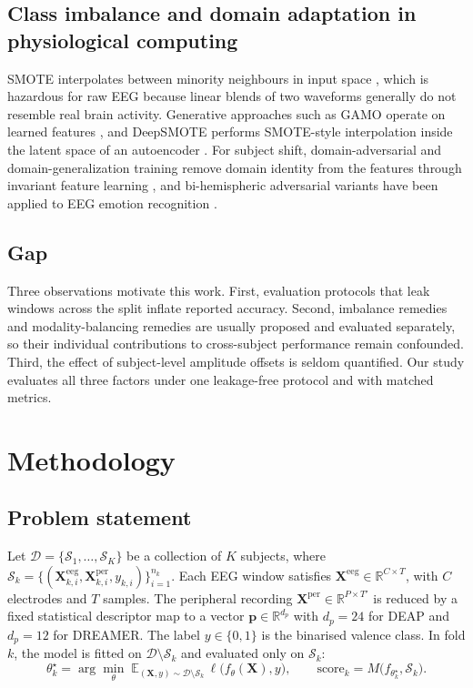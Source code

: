 \documentclass[a4paper,fleqn]{cas-sc}
\begin{document}
\subsection{Class imbalance and domain adaptation in physiological computing}
SMOTE interpolates between minority neighbours in input space \citep{elreedy2021smote}, which is hazardous for raw EEG because linear blends of two waveforms generally do not resemble real brain activity. Generative approaches such as GAMO operate on learned features \citep{mullick2019gamo}, and DeepSMOTE performs SMOTE-style interpolation inside the latent space of an autoencoder \citep{dablain2023deepsmote}. For subject shift, domain-adversarial and domain-generalization training remove domain identity from the features through invariant feature learning \citep{wang2023cross}, and bi-hemispheric adversarial variants have been applied to EEG emotion recognition \citep{li2021bidann}.

\subsection{Gap}
Three observations motivate this work. First, evaluation protocols that leak windows across the split inflate reported accuracy. Second, imbalance remedies and modality-balancing remedies are usually proposed and evaluated separately, so their individual contributions to cross-subject performance remain confounded. Third, the effect of subject-level amplitude offsets is seldom quantified. Our study evaluates all three factors under one leakage-free protocol and with matched metrics.

\section{Methodology}
\label{sec:method}

\subsection{Problem statement}
Let $\mathcal{D}=\{\mathcal{S}_1,\dots,\mathcal{S}_K\}$ be a collection of $K$ subjects, where $\mathcal{S}_k=\{(\mathbf{X}^{\mathrm{eeg}}_{k,i},\mathbf{X}^{\mathrm{per}}_{k,i},y_{k,i})\}_{i=1}^{n_k}$. Each EEG window satisfies $\mathbf{X}^{\mathrm{eeg}}\in\mathbb{R}^{C\times T}$, with $C$ electrodes and $T$ samples. The peripheral recording $\mathbf{X}^{\mathrm{per}}\in\mathbb{R}^{P\times T'}$ is reduced by a fixed statistical descriptor map to a vector $\mathbf{p}\in\mathbb{R}^{d_p}$ with $d_p=24$ for DEAP and $d_p=12$ for DREAMER. The label $y\in\{0,1\}$ is the binarised valence class. In fold $k$, the model is fitted on $\mathcal{D}\setminus\mathcal{S}_k$ and evaluated only on $\mathcal{S}_k$:
\begin{equation}
\theta_k^\star=\arg\min_{\theta}\;\mathbb{E}_{(\mathbf{X},y)\sim\mathcal{D}\setminus\mathcal{S}_k}\,\ell\bigl(f_\theta(\mathbf{X}),y\bigr),\qquad
\text{score}_k=M\bigl(f_{\theta_k^\star},\mathcal{S}_k\bigr).
\end{equation}
\end{document}
